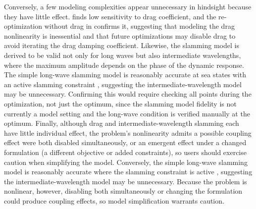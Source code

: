\ifdefined\DISSERTATION
    Conversely, a few modeling complexities appear unnecessary in hindsight because they have little effect.
     finds low sensitivity to drag coefficient, and the re-optimization without drag in  confirms it, suggesting that modeling the drag nonlinearity is inessential and that future optimizations may disable drag to avoid iterating the drag damping coefficient.
    Likewise, the slamming model is derived to be valid not only for long waves but also intermediate wavelengths, where the maximum amplitude depends on the phase of the dynamic response.
    The simple long-wave slamming model is reasonably accurate at sea states with an active slamming constraint \citep{mccabe_development_2026}, suggesting the intermediate-wavelength model may be unnecessary.
    Confirming this would require checking all points during the optimization, not just the optimum, since the slamming model fidelity is not currently a model setting and the long-wave condition is verified manually at the optimum. %
    Finally, although drag and intermediate-wavelength slamming each have little individual effect, the problem's nonlinearity admits a possible coupling effect were both disabled simultaneously, or an emergent effect under a changed formulation (a different objective or added constraints), so users should exercise caution when simplifying the model.
\else
    Conversely, 
    the simple long-wave slamming model is reasonably accurate where the slamming constraint is active \citep{mccabe_development_2026}, suggesting the intermediate-wavelength model may be unnecessary.
    Because the problem is nonlinear, however, disabling both simultaneously or changing the formulation could produce coupling effects, so model simplification warrants caution.
\fi

